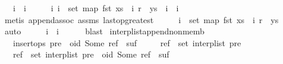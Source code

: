 \begin{isabellebody}
\ \ \ {\isachardoublequoteopen}i{}\ {\isacharless}\ i{}{\isachardoublequoteclose}\isanewline
%
\isadelimproof
%
\endisadelimproof
%
\isatagproof
{}\isamarkupfalse%
\ {\isacharminus}\isanewline
\ \ \isamarkupfalse%
\ {\isachardoublequoteopen}{\isasymAnd}i{\isachardot}\ i\ {\isasymin}\ set\ {\isacharparenleft}map\ fst\ {\isacharparenleft}xs\ {\isacharat}\ {\isacharbrackleft}{\isacharparenleft}i{}{\isacharcomma}\ r{}{\isacharparenright}{\isacharbrackright}\ {\isacharat}\ ys{\isacharparenright}{\isacharparenright}\ {\isasymLongrightarrow}\ i\ {\isacharless}\ i{}{\isachardoublequoteclose}\isanewline
\ \ \ \ \isamarkupfalse%
\ {\isacharparenleft}metis\ append{\isachardot}assoc\ assms\ last{\isacharunderscore}op{\isacharunderscore}greatest{\isacharparenright}\isanewline
\ \ \isamarkupfalse%
\ \isamarkupfalse%
\ {\isachardoublequoteopen}i{}\ {\isasymin}\ set\ {\isacharparenleft}map\ fst\ {\isacharparenleft}xs\ {\isacharat}\ {\isacharbrackleft}{\isacharparenleft}i{}{\isacharcomma}\ r{}{\isacharparenright}{\isacharbrackright}\ {\isacharat}\ ys{\isacharparenright}{\isacharparenright}{\isachardoublequoteclose}\isanewline
\ \ \ \ \isamarkupfalse%
\ auto\isanewline
\ \ \isamarkupfalse%
\ \isamarkupfalse%
\ {\isachardoublequoteopen}i{}\ {\isacharless}\ i{}{\isachardoublequoteclose}\isanewline
\ \ \ \ \isamarkupfalse%
\ blast\isanewline
{}\isamarkupfalse%
%
\endisatagproof
{\isafoldproof}%
%
\isadelimproof
\isanewline
%
\endisadelimproof
\isanewline
{}\isamarkupfalse%
\ interp{\isacharunderscore}list{\isacharunderscore}append{\isacharunderscore}non{\isacharunderscore}memb{\isacharcolon}\isanewline
\ \ \ {\isachardoublequoteopen}insert{\isacharunderscore}ops\ {\isacharparenleft}pre\ {\isacharat}\ {\isacharbrackleft}{\isacharparenleft}oid{\isacharcomma}\ Some\ ref{\isacharparenright}{\isacharbrackright}\ {\isacharat}\ suf{\isacharparenright}{\isachardoublequoteclose}\isanewline
\ \ \ \ \ {\isachardoublequoteopen}ref\ {\isasymnotin}\ set\ {\isacharparenleft}interp{\isacharunderscore}list\ pre{\isacharparenright}{\isachardoublequoteclose}\isanewline
\ \ \ {\isachardoublequoteopen}ref\ {\isasymnotin}\ set\ {\isacharparenleft}interp{\isacharunderscore}list\ {\isacharparenleft}pre\ {\isacharat}\ {\isacharbrackleft}{\isacharparenleft}oid{\isacharcomma}\ Some\ ref{\isacharparenright}{\isacharbrackright}\ {\isacharat}\ suf{\isacharparenright}{\isacharparenright}{\isachardoublequoteclose}\isanewline

\end{isabellebody}
